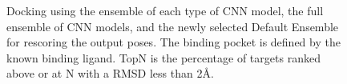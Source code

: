\documentclass[linenumbers,doublespacing]{bmcart}
\begin{document}
\begin{figure}[tb]
	\caption{Docking using the ensemble of each type of CNN model, the full ensemble of CNN models, and the newly selected Default Ensemble for rescoring the output poses. The binding pocket is defined by the known binding ligand. TopN is the percentage of targets ranked above or at N with a RMSD less than 2{\AA}.}
	\label{fig:RescoreEnsemble}
\end{figure}    
\end{document}
